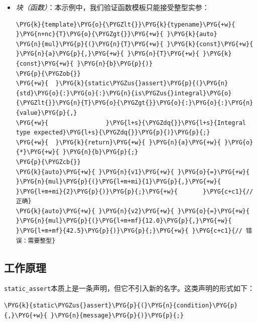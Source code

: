 \begin{itemize}

\item \textit{块（函数）}：本示例中，我们验证函数模板只能接受整型实参：



\begin{codeblockbg}
\begin{Verbatim}[commandchars=\\\{\},breaklines=true,breakanywhere=true,fontsize=\codefont,xleftmargin=17bp]
\PYG{k}{template}\PYG{o}{\PYGZlt{}}\PYG{k}{typename}\PYG{+w}{ }\PYG{n+nc}{T}\PYG{o}{\PYGZgt{}}\PYG{+w}{ }\PYG{k}{auto}
\PYG{n}{mul}\PYG{p}{(}\PYG{n}{T}\PYG{+w}{ }\PYG{k}{const}\PYG{+w}{ }\PYG{n}{a}\PYG{p}{,}\PYG{+w}{ }\PYG{n}{T}\PYG{+w}{ }\PYG{k}{const}\PYG{+w}{ }\PYG{n}{b}\PYG{p}{)}
\PYG{p}{\PYGZob{}}
\PYG{+w}{  }\PYG{k}{static\PYGZus{}assert}\PYG{p}{(}\PYG{n}{std}\PYG{o}{:}\PYG{o}{:}\PYG{n}{is\PYGZus{}integral}\PYG{o}{\PYGZlt{}}\PYG{n}{T}\PYG{o}{\PYGZgt{}}\PYG{o}{:}\PYG{o}{:}\PYG{n}{value}\PYG{p}{,}
\PYG{+w}{                }\PYG{l+s}{\PYGZdq{}}\PYG{l+s}{Integral type expected}\PYG{l+s}{\PYGZdq{}}\PYG{p}{)}\PYG{p}{;}
\PYG{+w}{  }\PYG{k}{return}\PYG{+w}{ }\PYG{n}{a}\PYG{+w}{ }\PYG{o}{*}\PYG{+w}{ }\PYG{n}{b}\PYG{p}{;}
\PYG{p}{\PYGZcb{}}
\PYG{k}{auto}\PYG{+w}{ }\PYG{n}{v1}\PYG{+w}{ }\PYG{o}{=}\PYG{+w}{ }\PYG{n}{mul}\PYG{p}{(}\PYG{l+m+mi}{1}\PYG{p}{,}\PYG{+w}{ }\PYG{l+m+mi}{2}\PYG{p}{)}\PYG{p}{;}\PYG{+w}{       }\PYG{c+c1}{// 正确}
\PYG{k}{auto}\PYG{+w}{ }\PYG{n}{v2}\PYG{+w}{ }\PYG{o}{=}\PYG{+w}{ }\PYG{n}{mul}\PYG{p}{(}\PYG{l+m+mf}{12.0}\PYG{p}{,}\PYG{+w}{ }\PYG{l+m+mf}{42.5}\PYG{p}{)}\PYG{p}{;}\PYG{+w}{ }\PYG{c+c1}{// 错误：需要整型}
\end{Verbatim}
\end{codeblockbg}

\end{itemize}



\subsection{工作原理}



\texttt{static\_\allowbreak{}assert}本质上是一条声明，但它不引入新的名字。这类声明的形式如下：



\begin{codeblockbg}
\begin{Verbatim}[commandchars=\\\{\},breaklines=true,breakanywhere=true,fontsize=\codefont,xleftmargin=17bp]
\PYG{k}{static\PYGZus{}assert}\PYG{p}{(}\PYG{n}{condition}\PYG{p}{,}\PYG{+w}{ }\PYG{n}{message}\PYG{p}{)}\PYG{p}{;}
\end{Verbatim}
\end{codeblockbg}


